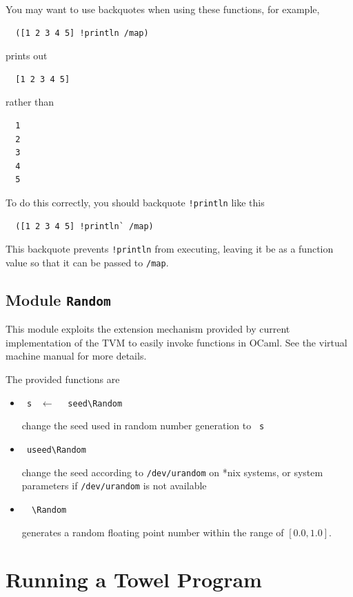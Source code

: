 \documentclass{report}
\newcommand{\mtilde}[1]{\textasciitilde}
\newcommand{\marg}[1]{\texttt{\mtilde ~#1}}
\newcommand{\mla}[0]{~$\leftarrow$ ~}
\begin{document}
\begin{mdframed}[style=hint]
  You may want to use backquotes when using these functions, for example,

\begin{verbatim}
  ([1 2 3 4 5] !println /map)
\end{verbatim}

prints out
\begin{verbatim}
  [1 2 3 4 5]
\end{verbatim}

rather than
\begin{verbatim}
  1
  2
  3
  4
  5
\end{verbatim}

To do this correctly, you should backquote \texttt{!println} like this

\begin{verbatim}
  ([1 2 3 4 5] !println` /map)
\end{verbatim}

This backquote prevents \texttt{!println} from executing, leaving it be as a function value so that it can be passed to \texttt{/map}.
\end{mdframed}

\section{Module \texttt{Random}}

This module exploits the extension mechanism provided by current implementation of the TVM to easily invoke functions in OCaml. See the virtual machine manual for more details.

The provided functions are
\begin{itemize}
\item \marg{s} \mla \texttt{\mtilde ~seed\textbackslash Random}

change the seed used in random number generation to \marg{s}
\item \texttt{\mtilde ~useed\textbackslash Random}

change the seed according to \texttt{/dev/urandom} on *nix systems, or system parameters if \texttt{/dev/urandom} is not available
\item \texttt{\mtilde ~\mtilde ~\textbackslash Random}

generates a random floating point number within the range of $[0.0, 1.0]$.
\end{itemize}


\chapter{Running a Towel Program}
\end{document}
